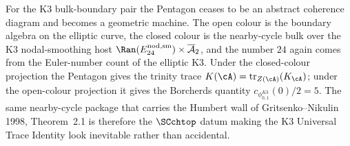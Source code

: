 \begin{example}
\label{ex:sc-pentagon-k3-trace}
For the K3 bulk-boundary pair the Pentagon ceases to be an abstract
coherence diagram and becomes a geometric machine. The open colour is
the boundary algebra on the elliptic curve, the closed colour is the
nearby-cycle bulk over the K3 nodal-smoothing host
$\Ran(E^{\mathrm{nod,sm}}_{24}) \times \overline{\mathcal{A}}_2$, and
the number $24$ again comes from the Euler-number count of the elliptic
K3. Under the closed-colour projection the Pentagon gives the trinity
trace $K(\cA)=\mathrm{tr}_{Z(\cA)}(K_\cA)$; under the open-colour
projection it gives the Borcherds quantity
$c_{\phi_{0,1}^{K3}}(0)/2=5$. The same
nearby-cycle package that carries the Humbert wall of
Gritsenko--Nikulin 1998, Theorem~2.1 is therefore the
$\SCchtop$ datum making the K3 Universal Trace Identity look
inevitable rather than accidental.
\end{example}

